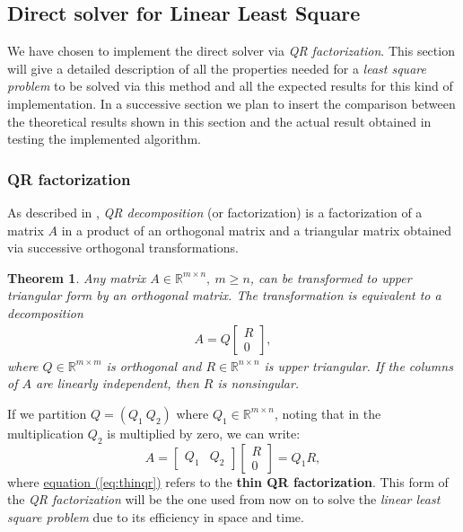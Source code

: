 \subsection{Direct solver for Linear Least Square}
\label{sec:qr}
We have chosen to implement the direct solver via \textit{QR factorization}. This section will give a detailed description of all the properties needed for a \textit{least square problem} to be solved via this method and all the expected results for this kind of implementation. In a successive section we plan to insert the comparison between the theoretical results shown in this section and the actual result obtained in testing the implemented algorithm.
\subsubsection{QR factorization}
\label{subsec:qr}
As described in \parencite[Chap. 5]{elden}, \textit{QR decomposition} (or factorization) is a factorization of a matrix $A$ in a product of an orthogonal matrix and a triangular matrix obtained via successive orthogonal transformations.
\newtheorem{thm}{Theorem}[section]
\newtheorem{lemma}[thm]{Lemma}
\begin{thm}
\label{thm:qr}
Any matrix $A\in \mathbb{R}^{m\times n},\ m\geq n$, can be transformed to upper triangular form by an orthogonal matrix. The transformation is equivalent to a decomposition
\begin{align*}
    A = Q\begin{bmatrix}R \\ 0\end{bmatrix},
\end{align*} where $Q\in \mathbb{R}^{m\times m}$ is orthogonal and $R\in \mathbb{R}^{n\times n}$ is upper triangular. If the columns of $A$ are linearly independent, then $R$ is nonsingular.
\end{thm}
If we partition $Q = (Q_1\ Q_2)$ where $Q_1\in \mathbb{R}^{m\times n}$, noting that in the multiplication $Q_2$ is multiplied by zero, we can write:
\begin{equation}
\label{eq:thinqr}
    A = \begin{bmatrix}Q_1 & Q_2\end{bmatrix}\begin{bmatrix}R \\ 0\end{bmatrix} = Q_1R,
\end{equation}
where \hyperref[eq:thinqr]{equation (\ref{eq:thinqr})} refers to the \textbf{thin QR factorization}. This form of the \textit{QR factorization} will be the one used from now on to solve the \textit{linear least square problem} due to its efficiency in space and time.

